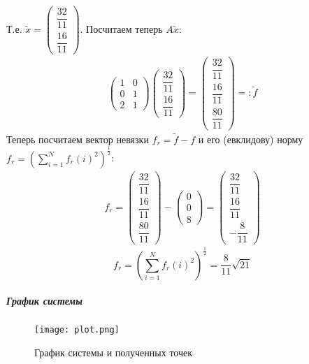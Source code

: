 \documentclass[11pt,a4paper]{report}
\begin{document}
Т.е. $\tilde{x} = \begin{pmatrix} \dfrac{32}{11}\\[2ex]\dfrac{16}{11} \end{pmatrix}$. Посчитаем теперь $A\tilde{x}$:
\begin{gather*}
\begin{pmatrix} 1&0\\0&1\\2&1 \end{pmatrix}\begin{pmatrix} \dfrac{32}{11}\\[2ex]\dfrac{16}{11} \end{pmatrix}=\begin{pmatrix} \dfrac{32}{11}\\[2ex]\dfrac{16}{11}\\[2ex]\dfrac{80}{11} \end{pmatrix} =: \tilde{f}
\end{gather*}
Теперь посчитаем вектор невязки $f_r = \tilde{f} - f$ и его (евклидову) норму $f_r = (\sum_{i=1}^{N} f_r(i)^2)^{\frac{1}{2}}$:
\begin{gather*}
f_r =  \begin{pmatrix} \dfrac{32}{11}\\[2ex]\dfrac{16}{11}\\[2ex]\dfrac{80}{11} \end{pmatrix} - \begin{pmatrix} 0\\0\\8 \end{pmatrix} = \begin{pmatrix} \dfrac{32}{11}\\[2ex]\dfrac{16}{11}\\[2ex]-\dfrac{8}{11} \end{pmatrix}
\end{gather*}
\[
f_r = (\sum_{i=1}^{N} f_r(i)^2)^{\frac{1}{2}} = \frac{8}{11}\sqrt{21}
\]
\subparagraph{График системы}
\begin{figure}[h!]
	\centering
	\texttt{[image: plot.png]}
	\caption{График системы и полученных точек}
	\label{fig:plot}
\end{figure}
\end{document}
